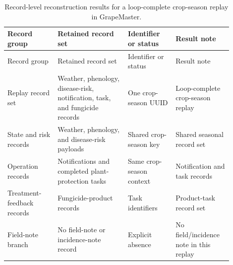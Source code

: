 \documentclass[12pt]{article}
\begin{document}
\begingroup
\setlength{\tabcolsep}{3pt}
\renewcommand{\arraystretch}{1.12}
\begin{longtable}{@{}L{0.20\linewidth} L{0.29\linewidth} L{0.19\linewidth} L{0.22\linewidth}@{}}
\caption{Record-level reconstruction results for a loop-complete crop-season replay in GrapeMaster.}\label{tab:supp_crop_season_replay_audit}\\
\toprule
Record group & Retained record set & Identifier or status & Result note \\
\midrule
\endfirsthead
\toprule
Record group & Retained record set & Identifier or status & Result note \\
\midrule
\endhead
Replay record set & Weather, phenology, disease-risk, notification, task, and fungicide records & One crop-season UUID & Loop-complete crop-season replay \\
State and risk records & Weather, phenology, and disease-risk payloads & Shared crop-season key & Shared seasonal record set \\
Operation records & Notifications and completed plant-protection tasks & Same crop-season context & Notification and task records \\
Treatment-feedback records & Fungicide-product records & Task identifiers & Product-task record set \\
Field-note branch & No field-note or incidence-note record & Explicit absence & No field/incidence note in this replay \\
\bottomrule
\end{longtable}
\endgroup
\end{document}

